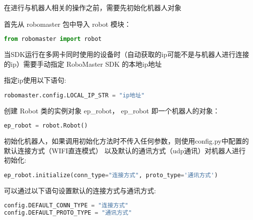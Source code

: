 

在进行与机器人相关的操作之前，需要先初始化机器人对象

首先从 robomaster 包中导入 robot 模块：

\begin{lstlisting}[language=python]
from robomaster import robot
\end{lstlisting}

当SDK运行在多网卡同时使用的设备时（自动获取的ip可能不是与机器人进行连接的ip）需要手动指定 RoboMaster SDK 的本地ip地址

指定ip使用以下语句:

\begin{lstlisting}[language=python]
robomaster.config.LOCAL_IP_STR = "ip地址"
\end{lstlisting}

创建 Robot 类的实例对象 ep_robot， ep_robot 即一个机器人的对象：

\begin{lstlisting}[language=python]
ep_robot = robot.Robot()
\end{lstlisting}

初始化机器人，如果调用初始化方法时不传入任何参数，则使用config.py中配置的默认连接方式（WIFI直连模式） 以及默认的通讯方式（udp通讯）对机器人进行初始化:

\begin{lstlisting}[language=python]
ep_robot.initialize(conn_type="连接方式", proto_type='通讯方式')
\end{lstlisting}

可以通过以下语句设置默认的连接方式与通讯方式:

\begin{lstlisting}[language=python]
config.DEFAULT_CONN_TYPE = "连接方式"
config.DEFAULT_PROTO_TYPE = "通讯方式"
\end{lstlisting}
